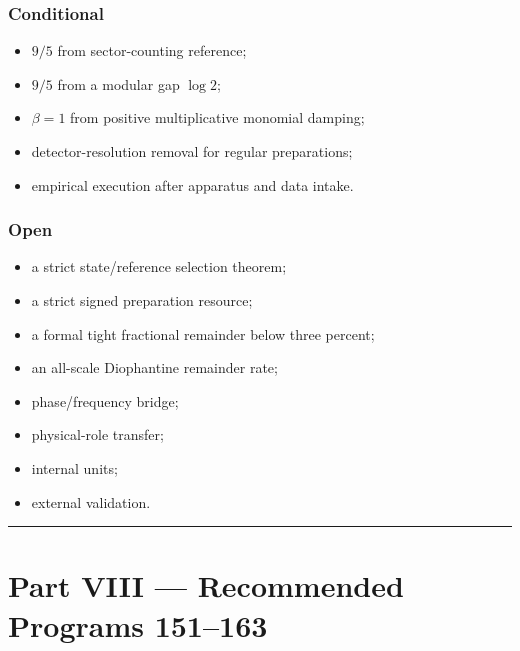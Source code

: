 \documentclass[11pt,a4paper,openany]{report}
\begin{document}
\subsection{Conditional}

\begin{itemize}
\item 
\(9/5\) from sector-counting reference;

\item 
\(9/5\) from a modular gap \(\log2\);

\item 
\(\beta=1\) from positive multiplicative monomial damping;

\item 
detector-resolution removal for regular preparations;

\item 
empirical execution after apparatus and data intake.

\end{itemize}

\subsection{Open}

\begin{itemize}
\item 
a strict state/\allowbreak{}reference selection theorem;

\item 
a strict signed preparation resource;

\item 
a formal tight fractional remainder below three percent;

\item 
an all-scale Diophantine remainder rate;

\item 
phase/\allowbreak{}frequency bridge;

\item 
physical-role transfer;

\item 
internal units;

\item 
external validation.

\end{itemize}

\par\medskip\hrule\medskip

\chapter{Part VIII --- Recommended Programs 151--163}
\end{document}
